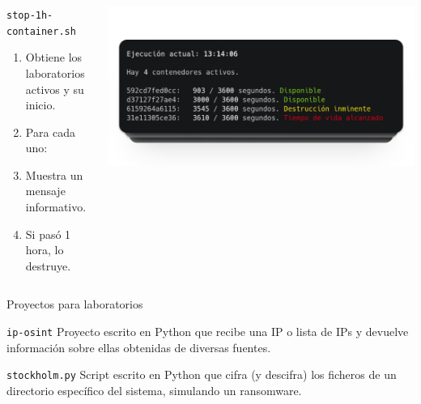    \begin{frame}
        \begin{columns}[c]
                \begin{block}{\texttt{stop-1h-container.sh}}
                    \scriptsize

                    \begin{enumerate}
                        \item {Obtiene los laboratorios\\activos y su inicio.}
                        \item Para cada uno:
                        \item Muestra un mensaje informativo.
                        \item Si pasó 1 hora, lo destruye.
                    \end{enumerate}
                \end{block}
            
                \includegraphics[scale=0.2]{images/capturas/cron.png}
        \end{columns}
    \end{frame}

    \begin{frame}{Proyectos para laboratorios}
        \begin{block}{\texttt{ip-osint}}
            Proyecto escrito en Python que recibe una IP o lista de IPs y devuelve información sobre ellas obtenidas de diversas fuentes.
        \end{block}
        
        \begin{block}{\texttt{stockholm.py}}
            Script escrito en Python que cifra (y descifra) los ficheros de un directorio específico del sistema, simulando un ransomware.
        \end{block}
    \end{frame}


